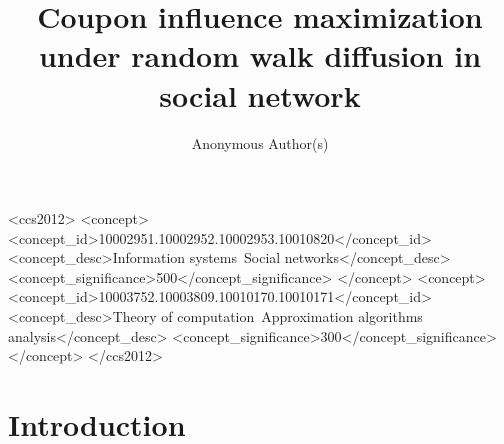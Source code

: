 \documentclass[sigconf]{acmart}
\begin{document}
\title{Coupon influence maximization under random walk diffusion in social network}

\author{Anonymous Author(s)}

\renewcommand{\shortauthors}{Anon.}

\begin{abstract}



\end{abstract}

\begin{CCSXML}
<ccs2012>
 <concept>
  <concept_id>10002951.10002952.10002953.10010820</concept_id>
  <concept_desc>Information systems~Social networks</concept_desc>
  <concept_significance>500</concept_significance>
 </concept>
 <concept>
  <concept_id>10003752.10003809.10010170.10010171</concept_id>
  <concept_desc>Theory of computation~Approximation algorithms analysis</concept_desc>
  <concept_significance>300</concept_significance>
 </concept>
</ccs2012>
\end{CCSXML}



\maketitle

\section{Introduction}
\label{sec:intro}
\end{document}
